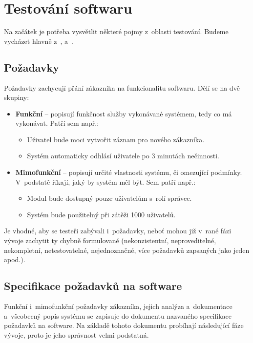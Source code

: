 \chapter{Testování softwaru}
Na začátek je potřeba vysvětlit některé pojmy z~oblasti testování. Budeme vycházet hlavně z~\citep{RizeniKvalitySW}, \citep{Patton} a~\citep{Herout}.

	\section{Požadavky}
	Požadavky zachycují přání zákazníka na funkcionalitu softwaru. Dělí se na dvě skupiny:
		\begin{itemize}
			\item \textbf{Funkční} -- popisují funkčnost služby vykonávané systémem, tedy co má vykonávat. Patří sem např.:
				\begin{itemize}
					\item Uživatel bude moci vytvořit záznam pro nového zákazníka.
					\item Systém automaticky odhlásí uživatele po 3 minutách nečinnosti.
				\end{itemize}
			\item \textbf{Mimofunkční} -- popisují určité vlastnosti systému, či omezující podmínky. V~podstatě říkají, jaký by systém měl být. Sem patří např.:
				\begin{itemize}
					\item Modul  bude dostupný pouze uživatelům s~rolí správce.
					\item Systém bude použitelný při zátěži 1000 uživatelů.
				\end{itemize}
		\end{itemize}
	
	Je vhodné, aby se testeři zabývali i~požadavky, neboť mohou již v~rané fázi vývoje zachytit ty chybně formulované (nekonzistentní, neproveditelné, nekompletní, netestovatelné, nejednoznačné, více požadavků zapsaných jako jeden apod.).
	
	\section{Specifikace požadavků na software}
	Funkční i~mimofunkční požadavky zákazníka, jejich analýza a~dokumentace a~všeobecný popis systému se zapisuje do dokumentu nazvaného specifikace požadavků na software. Na základě tohoto dokumentu probíhají následující fáze vývoje, proto je jeho správnost velmi podstatná.
	
